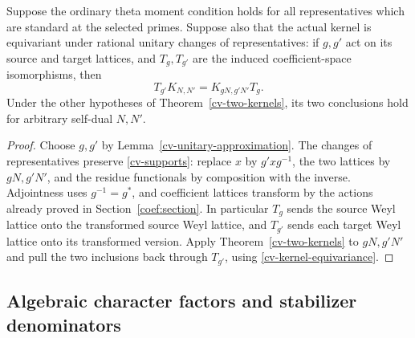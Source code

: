 \begin{corollary}
\label{cv-kernel-transport}
Suppose the ordinary theta moment condition holds for all representatives
which are standard at the selected primes.  Suppose also that the actual
kernel is equivariant under rational unitary changes of representatives:
if $g,g'$ act on its source and target lattices, and $T_g,T_{g'}$ are
the induced coefficient-space isomorphisms, then
\[
 T_{g'}K_{N,N'}=K_{gN,g'N'}T_g.
 \tag{CV13a}\label{cv-kernel-equivariance}
\]
Under the other hypotheses of Theorem~\ref{cv-two-kernels}, its two
conclusions hold for arbitrary self-dual $N,N'$.
\end{corollary}
\begin{proof}
Choose $g,g'$ by Lemma~\ref{cv-unitary-approximation}.
The changes of representatives preserve
\eqref{cv-supports}: replace $x$ by $g'xg^{-1}$, the two lattices
by $gN,g'N'$, and the residue functionals by composition with the
inverse.  Adjointness uses $g^{-1}=g^*$, and coefficient lattices
transform by the actions already proved in
Section~\ref{coef:section}.  In particular $T_g$ sends the source
Weyl lattice onto the transformed source Weyl lattice, and $T_{g'}$
sends each target Weyl lattice onto its transformed version.
Apply Theorem~\ref{cv-two-kernels} to $gN,g'N'$ and pull the two
inclusions back through $T_{g'}$, using \eqref{cv-kernel-equivariance}.
\end{proof}

\subsection{Algebraic character factors and stabilizer denominators}

